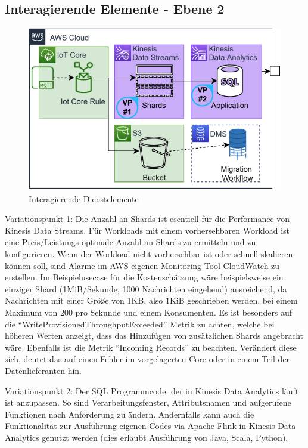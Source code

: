 \subsection{Interagierende Elemente - Ebene 2}
\begin{figure}[H]
\centering
\includegraphics[height=0.33\textheight]{graphics/Echtzeit-RA-Elements.pdf}
\caption{Interagierende Dienstelemente}
\label{abb:ElementeEchtzeitRA}
\end{figure}
Variationspunkt 1: Die Anzahl an Shards ist esentiell für die Performance von Kinesis Data Streams. Für Workloads mit einem vorhersehbaren Workload ist eine Preis/Leistungs optimale Anzahl an Shards zu ermitteln und zu konfigurieren. Wenn der Workload nicht vorhersehbar ist oder schnell skalieren können soll, sind Alarme im AWS eigenen Monitoring Tool CloudWatch zu erstellen. Im Beispielusecase für die Kostenschätzung wäre beispielsweise ein einziger Shard (1MiB/Sekunde, 1000 Nachrichten eingehend) ausreichend, da Nachrichten mit einer Größe von 1KB, also \~1KiB geschrieben werden, bei einem Maximum von 200 pro Sekunde und einem Konsumenten. Es ist besonders auf die \enquote{WriteProvisionedThroughputExceeded} Metrik zu achten, welche bei höheren Werten anzeigt, dass das Hinzufügen von zusätzlichen Shards angebracht wäre. Ebenfalls ist die Metrik \enquote{Incoming Records} zu beachten. Verändert diese sich, deutet das auf einen Fehler im vorgelagerten \AWSIOT Core oder in einem Teil der Datenlieferanten hin.

Variationspunkt 2: Der \ac{SQL} Programmcode, der in Kinesis Data Analytics läuft ist anzupassen. So sind Verarbeitungsfenster, Attributsnamen und aufgerufene Funktionen nach Anforderung zu ändern. Andernfalls kann auch die Funktionalität zur Ausführung eigenen Codes via Apache Flink in Kinesis Data Analytics genutzt werden (dies erlaubt Ausführung von Java, Scala, Python).


